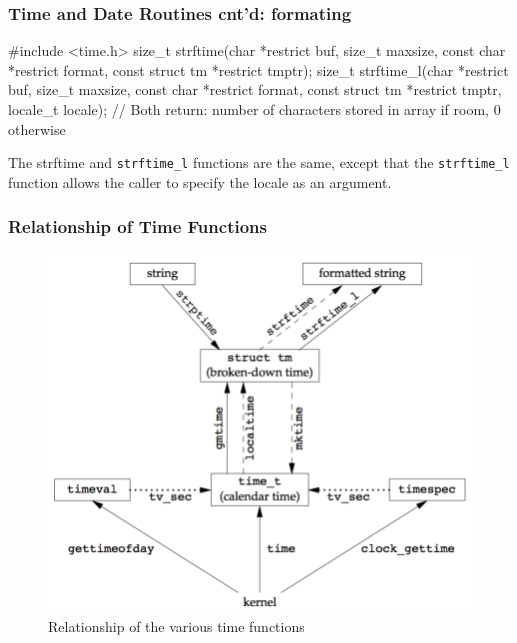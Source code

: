 \documentclass[newPxFont,sthlmFooter,nooffset]{beamer}
\begin{document}
\begin{frame}[containsverbatim,t]
  \frametitle{Time and Date Routines cnt'd: formating}

\begin{codedef}
#include <time.h>
size_t strftime(char *restrict buf, size_t maxsize, const char *restrict format, const struct tm *restrict tmptr);
size_t strftime_l(char *restrict buf, size_t maxsize, const char *restrict format, const struct tm *restrict tmptr, locale_t locale); 
// Both return: number of characters stored in array if room, 0 otherwise
\end{codedef}

The strftime and \texttt{strftime\_l} functions are the same, except that the \texttt{strftime\_l} function allows the caller to specify the locale as an argument.

\end{frame}



\begin{frame}[t]
  \frametitle{Relationship of Time Functions}

\begin{figure}[h]
  \centering
  \includegraphics[height=0.8\textheight]{figure/fig6-9_relationship.png}
  \caption{Relationship of the various time functions}
\end{figure}
\end{frame}
\end{document}

